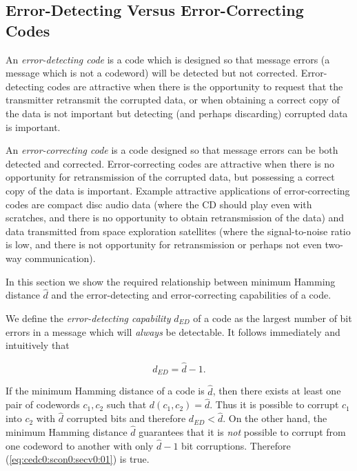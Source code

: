 \subsection{Error-Detecting Versus Error-Correcting Codes}
\label{cedc0:scon0:secv0}

An \emph{error-detecting code} is a code which is
designed so that message errors
(a message which is not a codeword) will be detected but not corrected.  
Error-detecting codes are attractive
when there is the opportunity to request that the transmitter retransmit the 
corrupted data, or when obtaining a correct copy of the data is not important but
detecting (and perhaps discarding) corrupted data is important.

An \emph{error-correcting code} is a code designed 
so that message errors can be both detected and corrected.  Error-correcting 
codes are attractive when 
there is no opportunity for retransmission of the corrupted data, but possessing
a correct copy of the data is important.  Example attractive 
applications of error-correcting codes are compact disc audio data (where the
CD should play even with scratches, and there is no opportunity to obtain
retransmission of the data) and data transmitted from space exploration satellites
(where the signal-to-noise ratio is low, and there is not opportunity for retransmission
or perhaps not even two-way communication).

In this section we show the required relationship between minimum Hamming
distance $\hat{d}$ and the error-detecting and error-correcting capabilities
of a code.

We define the %
\emph{error-detecting capability} $d_{ED}$ of a code as the largest number of bit errors 
in a message which will \emph{always} be detectable.  It follows
immediately and intuitively that 

\begin{equation}
\label{eq:cedc0:scon0:secv0:01}
d_{ED} = \hat{d} - 1 .
\end{equation}

\noindent{}If the minimum 
Hamming distance of a code is $\hat{d}$, then there exists at least
one pair of codewords
$c_1, c_2$ such that $d(c_1, c_2) = \hat{d}$.  Thus it is possible to corrupt
$c_1$ into $c_2$ with $\hat{d}$ corrupted bits and therefore
$d_{ED} < \hat{d}$.  On the other hand, the minimum Hamming distance 
$\hat{d}$ guarantees that it is \emph{not} possible to corrupt from one codeword to another
with only $\hat{d}-1$ bit corruptions.  Therefore
(\ref{eq:cedc0:scon0:secv0:01}) is true.

